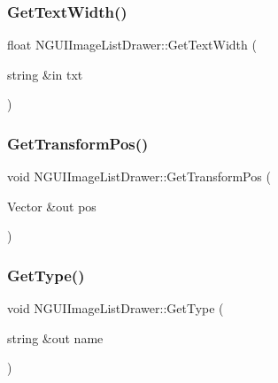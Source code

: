 \subsubsection{\texorpdfstring{Get\+Text\+Width()}{GetTextWidth()}}
{\footnotesize\ttfamily float N\+G\+U\+I\+Image\+List\+Drawer\+::\+Get\+Text\+Width (\begin{DoxyParamCaption}\item[{string \&in}]{txt }\end{DoxyParamCaption})}

\hypertarget{class_n_g_u_i_image_list_drawer_a121b81c497f2142b4b4541ead0b6d1fd}{}\label{class_n_g_u_i_image_list_drawer_a121b81c497f2142b4b4541ead0b6d1fd} 
\subsubsection{\texorpdfstring{Get\+Transform\+Pos()}{GetTransformPos()}}
{\footnotesize\ttfamily void N\+G\+U\+I\+Image\+List\+Drawer\+::\+Get\+Transform\+Pos (\begin{DoxyParamCaption}\item[{Vector \&out}]{pos }\end{DoxyParamCaption})}

\hypertarget{class_n_g_u_i_image_list_drawer_a5124fe7e041f46330b429eb77d064b7a}{}\label{class_n_g_u_i_image_list_drawer_a5124fe7e041f46330b429eb77d064b7a} 
\subsubsection{\texorpdfstring{Get\+Type()}{GetType()}}
{\footnotesize\ttfamily void N\+G\+U\+I\+Image\+List\+Drawer\+::\+Get\+Type (\begin{DoxyParamCaption}\item[{string \&out}]{name }\end{DoxyParamCaption})}

\hypertarget{class_n_g_u_i_image_list_drawer_a389c9e3330f48a3106a90c0e61299c5d}{}\label{class_n_g_u_i_image_list_drawer_a389c9e3330f48a3106a90c0e61299c5d} 
